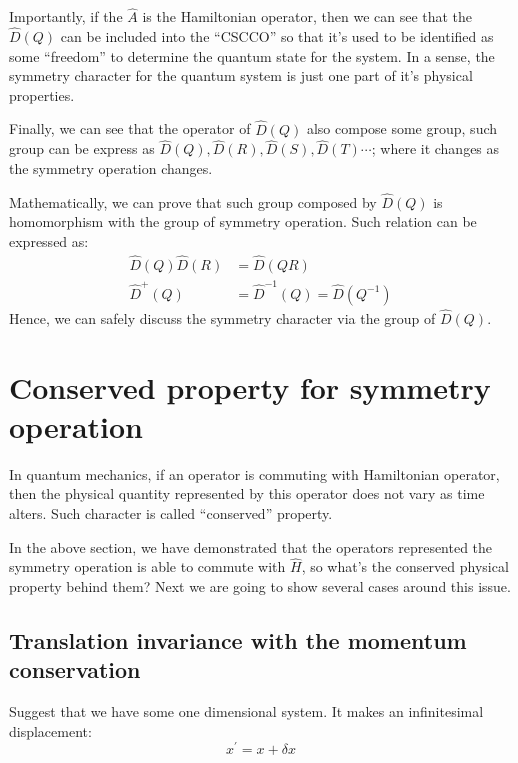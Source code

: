 Importantly, if the $\hat{A}$ is the Hamiltonian operator, then we
can see that the $\hat{D}(Q)$ can be included into the ``CSCCO'' so
that it's used to be identified as some ``freedom'' to determine the
quantum state for the system. In a sense, the symmetry character for
the quantum system is just one part of it's physical properties.

Finally, we can see that the operator of $\hat{D}(Q)$ also compose
some group, such group can be express as $\hat{D}(Q), \hat{D}(R),
\hat{D}(S), \hat{D}(T) \cdots$; where it changes as the symmetry
operation changes.

Mathematically, we can prove that such group composed by
$\hat{D}(Q)$ is homomorphism with the group of symmetry operation.
Such relation can be expressed as:
\begin{equation}\label{}
\begin{split}
  \hat{D}(Q)\hat{D}(R) &= \hat{D}(QR)  \\
  \hat{D}^{+}(Q) &= \hat{D}^{-1}(Q) = \hat{D}(Q^{-1})
\end{split}
\end{equation}
Hence, we can safely discuss the symmetry character via the group of
$\hat{D}(Q)$.


\section{Conserved property for symmetry operation}
%
%
%
In quantum mechanics, if an operator is commuting with Hamiltonian
operator, then the physical quantity represented by this operator
does not vary as time alters. Such character is called ``conserved''
property.

In the above section, we have demonstrated that the operators
represented the symmetry operation is able to commute with
$\hat{H}$, so what's the conserved physical property behind them?
Next we are going to show several cases around this issue.


\subsection{Translation invariance with the momentum conservation}
%
%
%
Suggest that we have some one dimensional system. It makes an
infinitesimal displacement:
\begin{equation}\label{}
x^{'} = x + \delta x
\end{equation}

